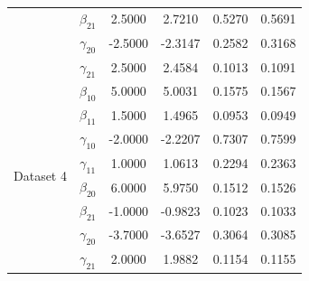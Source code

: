 \begin{table}[!h]
{\begin{tabular}{lccccc}
 & $\beta_{21}$ & 2.5000 & 2.7210 & 0.5270 & 0.5691\\
 & $\gamma_{20}$ & -2.5000 & -2.3147 & 0.2582 & 0.3168\\
 & $\gamma_{21}$ & 2.5000 & 2.4584 & 0.1013 & 0.1091\\
\midrule
\multirow{8}{*}{Dataset 4} & $\beta_{10}$ & 5.0000 & 5.0031 & 0.1575 & 0.1567\\
 & $\beta_{11}$ & 1.5000 & 1.4965 & 0.0953 & 0.0949\\
 & $\gamma_{10}$ & -2.0000 & -2.2207 & 0.7307 & 0.7599\\
 & $\gamma_{11}$ & 1.0000 & 1.0613 & 0.2294 & 0.2363\\
 & $\beta_{20}$ & 6.0000 & 5.9750 & 0.1512 & 0.1526\\
 & $\beta_{21}$ & -1.0000 & -0.9823 & 0.1023 & 0.1033\\
 & $\gamma_{20}$ & -3.7000 & -3.6527 & 0.3064 & 0.3085\\
 & $\gamma_{21}$ & 2.0000 & 1.9882 & 0.1154 & 0.1155\\
\bottomrule
\end{tabular}
}
    \label{tab:sim_more}
\end{table}
